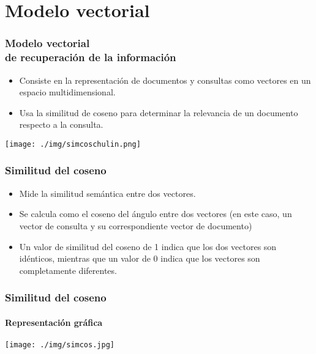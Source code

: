 \documentclass{beamer}
\begin{document}
\section{Modelo vectorial}
\begin{frame}
    \frametitle{\textbf{Modelo vectorial\\de recuperaci\'on de la informaci\'on}}
    \begin{itemize}
        \item Consiste en la representaci\'on de documentos y consultas como vectores en un espacio multidimensional.
        \item Usa la similitud de coseno para determinar la relevancia de un documento respecto a la consulta.
    \end{itemize}
    \vspace{1cm}
    \hspace*{5cm}
    \texttt{[image: ./img/simcoschulin.png]}
\end{frame}
\begin{frame}
    \frametitle{Similitud del coseno}
    \begin{itemize}
        \item Mide la similitud sem\'antica entre dos vectores.\pause
        \item Se calcula como el coseno del \'angulo entre dos vectores (en este caso, un vector de consulta y su correspondiente vector de documento)\pause
        \item Un valor de similitud del coseno de 1 indica que los dos vectores son id\'enticos, mientras que un valor de 0 indica que los vectores son completamente diferentes.
    \end{itemize}
\end{frame}
\begin{frame}
    \frametitle{Similitud del coseno}
    \framesubtitle{Representaci\'on gr\'afica}
    \texttt{[image: ./img/simcos.jpg]}
\end{frame}
\end{document}
